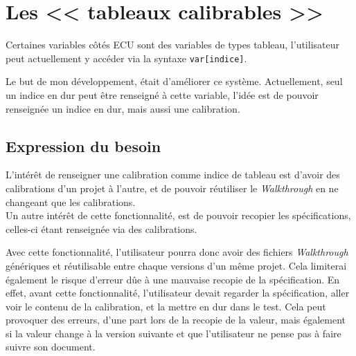 \section{Les << tableaux calibrables >>}
Certaines variables côtés ECU sont des variables de types tableau, l’utilisateur peut actuellement y accéder via la syntaxe \texttt{var[indice]}.

Le but de mon développement, était d’améliorer ce système. Actuellement, seul un indice en dur peut être renseigné à cette variable, l’idée est de pouvoir renseignée un indice en dur, mais aussi une calibration.

\subsection{Expression du besoin}\label{besoinTab}
L'intérêt de renseigner une calibration comme indice de tableau est d’avoir des calibrations d’un projet à l’autre, et de pouvoir réutiliser le \textit{Walkthrough} en ne changeant que les calibrations.\\
Un autre intérêt de cette fonctionnalité, est de pouvoir recopier les spécifications, celles-ci étant renseignée via des calibrations.

Avec cette fonctionnalité, l'utilisateur pourra donc avoir des fichiers \textit{Walkthrough} génériques et réutilisable entre chaque versions d'un même projet. Cela limiterai également le risque d'erreur dûe à une mauvaise recopie de la spécification. En effet, avant cette fonctionnalité, l'utilisateur devait regarder la spécification, aller voir le contenu de la calibration, et la mettre en dur dans le test. Cela peut provoquer des erreurs, d'une part lors de la recopie de la valeur, mais également si la valeur change à la version suivante et que l'utilisateur ne pense pas à faire suivre son document. 

